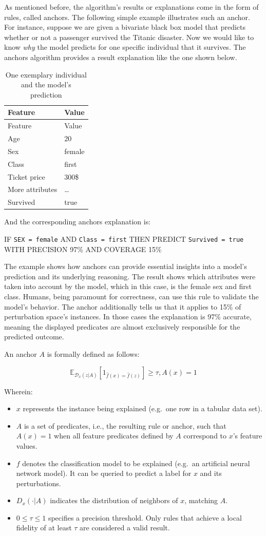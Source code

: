 \documentclass[
  11pt,
]{scrbook}
\providecommand{\tightlist}{%
  \setlength{\itemsep}{0pt}\setlength{\parskip}{0pt}}
\begin{document}
As mentioned before, the algorithm's results or explanations come in the form of rules, called anchors.
The following simple example illustrates such an anchor.
For instance, suppose we are given a bivariate black box model that predicts whether or not a passenger survived the Titanic disaster. Now we would like to know \emph{why} the model predicts for one specific individual that it survives.
The anchors algorithm provides a result explanation like the one shown below.

\begin{longtable}[]{@{}ll@{}}
\caption{One exemplary individual and the model's prediction}\tabularnewline
\toprule
Feature & Value\tabularnewline
\midrule
\endfirsthead
\toprule
Feature & Value\tabularnewline
\midrule
\endhead
Age & 20\tabularnewline
Sex & female\tabularnewline
Class & first\tabularnewline
Ticket price & 300\$\tabularnewline
More attributes & \ldots{}\tabularnewline
Survived & true\tabularnewline
\bottomrule
\end{longtable}

And the corresponding anchors explanation is:

IF \texttt{SEX\ =\ female} AND \texttt{Class\ =\ first} THEN PREDICT \texttt{Survived\ =\ true} WITH PRECISION 97\% AND COVERAGE 15\%

The example shows how anchors can provide essential insights into a model's prediction and its underlying reasoning. The result shows which attributes were taken into account by the model, which in this case, is the female sex and first class. Humans, being paramount for correctness, can use this rule to validate the model's behavior. The anchor additionally tells us that it applies to 15\% of perturbation space's instances. In those cases the explanation is 97\% accurate, meaning the displayed predicates are almost exclusively responsible for the predicted outcome.

An anchor \(A\) is formally defined as follows:

\[\mathbb{E}_{\mathcal{D}_x(z|A)}[1_{\hat{f}(x)=\hat{f}(z)}]\geq\tau,A(x)=1\]

Wherein:

\begin{itemize}
\tightlist
\item
  \(x\) represents the instance being explained (e.g.~one row in a tabular data set).
\item
  \(A\) is a set of predicates, i.e., the resulting rule or anchor, such that \(A(x)=1\) when all feature predicates defined by \(A\) correspond to \(x\)'s feature values.
\item
  \(f\) denotes the classification model to be explained (e.g.~an artificial neural network model). It can be queried to predict a label for \(x\) and its perturbations.
\item
  \(D_x (\cdot|A)\) indicates the distribution of neighbors of \(x\), matching \(A\).
\item
  \(0 \leq \tau \leq 1\) specifies a precision threshold. Only rules that achieve a local fidelity of at least \(\tau\) are considered a valid result.
\end{itemize}
\end{document}
